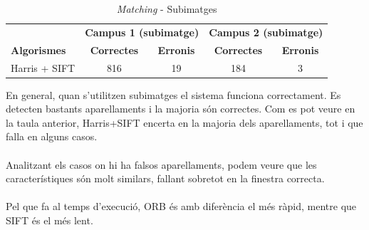 		\begin{table}[H]
			\begin{center}
				\begin{tabular}{l | c c | c c}
					& \multicolumn{2}{c|}{\textbf{Campus 1 (subimatge)}} & \multicolumn{2}{c}{\textbf{Campus 2 (subimatge)}} \\
					\textbf{Algorismes} & \textbf{Correctes} & \textbf{Erronis} & \textbf{Correctes} & \textbf{Erronis} \\ \hline
					Harris + SIFT & 816 & 19 & 184 & 3 \\
				\end{tabular}
			\end{center}
			\caption{\textit{Matching} - Subimatges}
		\end{table}

		\noindent
		En general, quan s'utilitzen subimatges el sistema funciona correctament. Es detecten bastants aparellaments i la majoria són correctes. Com es pot veure en la taula anterior,
		Harris+SIFT encerta en la majoria dels aparellaments, tot i que falla en alguns casos.\\\\
		Analitzant els casos on hi ha falsos aparellaments, podem veure que les característiques són molt similars, fallant sobretot en la finestra correcta.\\\\
		Pel que fa al temps d'execució, ORB és amb diferència el més ràpid, mentre que SIFT és el més lent.\\

